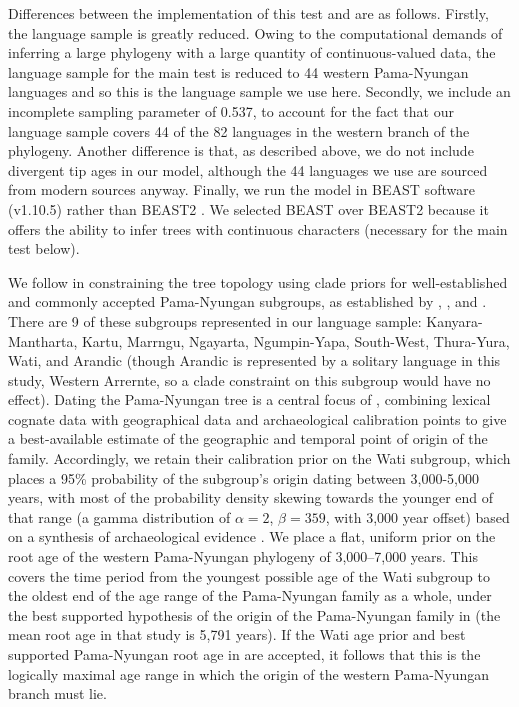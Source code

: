 \documentclass[]{article}
\begin{document}
Differences between the implementation of this test and \textcite{bouckaert_origin_2018} are as follows. Firstly, the language sample is greatly reduced. Owing to the computational demands of inferring a large phylogeny with a large quantity of continuous-valued data, the language sample for the main test is reduced to 44 western Pama-Nyungan languages and so this is the language sample we use here. Secondly, we include an incomplete sampling parameter of 0.537, to account for the fact that our language sample covers 44 of the 82 languages in the western branch of the \textcite{bouckaert_origin_2018} phylogeny. Another difference is that, as described above, we do not include divergent tip ages in our model, although the 44 languages we use are sourced from modern sources anyway. Finally, we run the model in BEAST software (v1.10.5) \autocite{suchard_bayesian_2018} rather than BEAST2 \autocite{bouckaert_beast_2019}. We selected BEAST over BEAST2 because it offers the ability to infer trees with continuous characters (necessary for the main test below).

We follow \textcite{bouckaert_origin_2018} in constraining the tree topology using clade priors for well-established and commonly accepted Pama-Nyungan subgroups, as established by \textcite{ogrady_languages_1966}, \textcite{muhlhausler_atlas_1996}, \textcite{koch_languages_2014} and \textcite{bowern_computational_2012}. There are 9 of these subgroups represented in our language sample: Kanyara-Mantharta, Kartu, Marrngu, Ngayarta, Ngumpin-Yapa, South-West, Thura-Yura, Wati, and Arandic (though Arandic is represented by a solitary language in this study, Western Arrernte, so a clade constraint on this subgroup would have no effect). Dating the Pama-Nyungan tree is a central focus of \textcite{bouckaert_origin_2018}, combining lexical cognate data with geographical data and archaeological calibration points to give a best-available estimate of the geographic and temporal point of origin of the family. Accordingly, we retain their calibration prior on the Wati subgroup, which places a 95\% probability of the subgroup's origin dating between 3,000-5,000 years, with most of the probability density skewing towards the younger end of that range (a gamma distribution of \(\alpha = 2\), \(\beta = 359\), with 3,000 year offset) based on a synthesis of archaeological evidence \autocite[see][p.~746]{bouckaert_origin_2018}. We place a flat, uniform prior on the root age of the western Pama-Nyungan phylogeny of 3,000--7,000 years. This covers the time period from the youngest possible age of the Wati subgroup to the oldest end of the age range of the Pama-Nyungan family as a whole, under the best supported hypothesis of the origin of the Pama-Nyungan family in \textcite{bouckaert_origin_2018} (the mean root age in that study is 5,791 years). If the Wati age prior and best supported Pama-Nyungan root age in \textcite{bouckaert_origin_2018} are accepted, it follows that this is the logically maximal age range in which the origin of the western Pama-Nyungan branch must lie.
\end{document}
